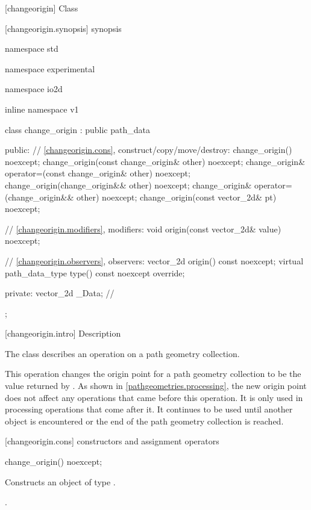  [changeorigin] {Class }

 [changeorigin.synopsis] { synopsis}

\begin{codeblock}
namespace std { namespace experimental { namespace io2d { inline namespace v1 {
  class change_origin : public path_data {
  public:
    // \ref{changeorigin.cons}, construct/copy/move/destroy:
    change_origin() noexcept;
    change_origin(const change_origin& other) noexcept;
    change_origin& operator=(const change_origin& other) noexcept;
    change_origin(change_origin&& other) noexcept;
    change_origin& operator=(change_origin&& other) noexcept;
    change_origin(const vector_2d& pt) noexcept;

    // \ref{changeorigin.modifiers}, modifiers:
    void origin(const vector_2d& value) noexcept;

    // \ref{changeorigin.observers}, observers:
    vector_2d origin() const noexcept;
    virtual path_data_type type() const noexcept override;
    
  private:
    vector_2d _Data; // \expos
  };
} } } }
\end{codeblock}

 [changeorigin.intro] { Description}

\pnum
{}
The class  describes an operation on a path geometry collection.

\pnum
This operation changes the origin point for a path geometry collection to be the value returned by . As shown in \ref{pathgeometries.processing}, the new origin point does not affect any operations that came before this operation. It is only used in processing operations that come after it. It continues to be used until another  object is encountered or the end of the path geometry collection is reached.

 [changeorigin.cons] { constructors and assignment operators}

\begin{itemdecl}
    change_origin() noexcept;
\end{itemdecl}
\begin{itemdescr}
	\pnum
	\effects
	Constructs an object of type .
	
	\pnum
	\postconditions
	.
\end{itemdescr}

